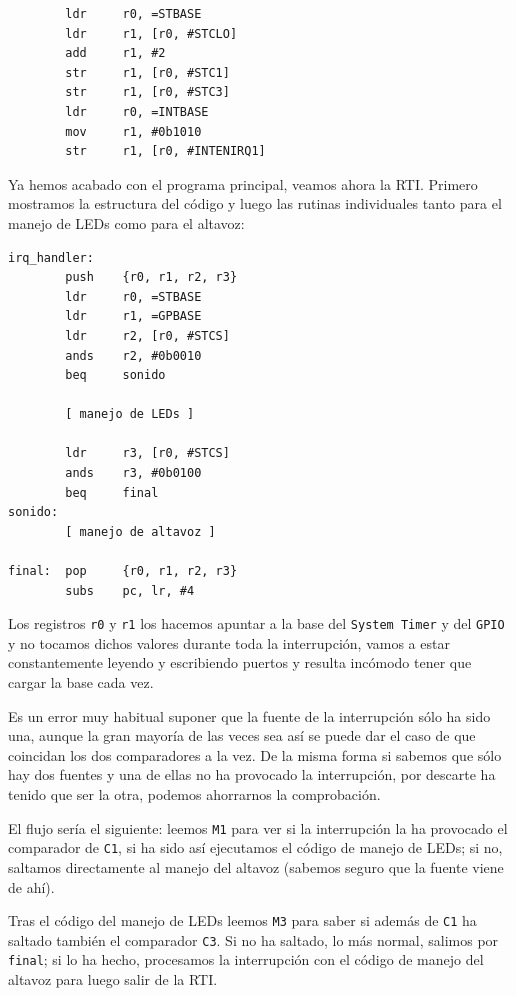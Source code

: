 \begin{lstlisting}
        ldr     r0, =STBASE
        ldr     r1, [r0, #STCLO]
        add     r1, #2
        str     r1, [r0, #STC1]
        str     r1, [r0, #STC3]
        ldr     r0, =INTBASE
        mov     r1, #0b1010
        str     r1, [r0, #INTENIRQ1]
\end{lstlisting}

Ya hemos acabado con el programa principal, veamos ahora la RTI. Primero mostramos la estructura
del código y luego las rutinas individuales tanto para el manejo de LEDs como para el
altavoz:

\begin{lstlisting}
irq_handler:
        push    {r0, r1, r2, r3}
        ldr     r0, =STBASE
        ldr     r1, =GPBASE
        ldr     r2, [r0, #STCS]
        ands    r2, #0b0010
        beq     sonido

        [ manejo de LEDs ]

        ldr     r3, [r0, #STCS]
        ands    r3, #0b0100
        beq     final
sonido:
        [ manejo de altavoz ]

final:  pop     {r0, r1, r2, r3}
        subs    pc, lr, #4
\end{lstlisting}

Los registros {\tt r0} y {\tt r1} los hacemos apuntar a la base del {\tt System Timer} y del
{\tt GPIO} y no tocamos dichos valores durante toda la interrupción, vamos a estar
constantemente leyendo y escribiendo puertos y resulta incómodo tener que cargar la
base cada vez.

Es un error muy habitual suponer que la fuente de la interrupción sólo ha sido una, aunque
la gran mayoría de las veces sea así se puede dar el caso de que coincidan los dos comparadores
a la vez. De la misma forma si sabemos que sólo hay dos fuentes y una de ellas no ha
provocado la interrupción, por descarte ha tenido que ser la otra, podemos ahorrarnos la
comprobación.

El flujo sería el siguiente: leemos {\tt M1} para ver si la interrupción la ha provocado el
comparador de {\tt C1}, si ha sido así ejecutamos el código de manejo de LEDs; si no,
saltamos directamente al manejo del altavoz (sabemos seguro que la fuente viene de ahí).

Tras el código del manejo de LEDs leemos {\tt M3} para saber si además de {\tt C1} ha
saltado también el comparador {\tt C3}. Si no ha saltado, lo más normal, salimos por
{\tt final}; si lo ha hecho, procesamos la interrupción con el código de manejo del altavoz
para luego salir de la RTI.

